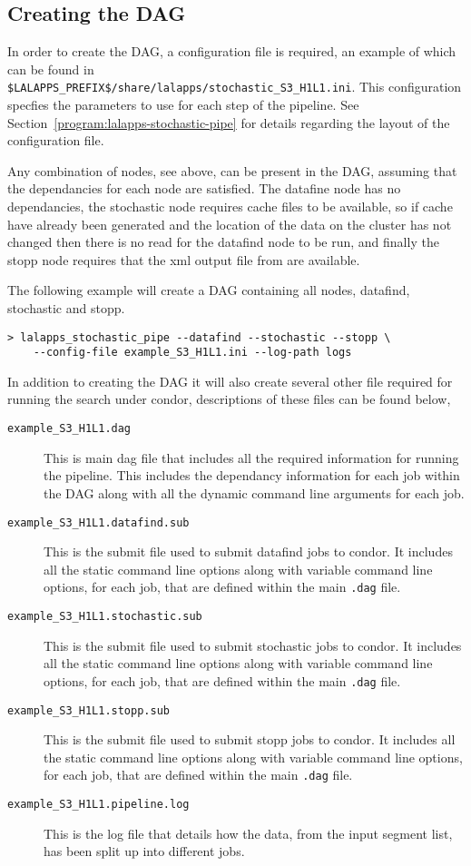 \subsection{Creating the DAG}

In order to create the DAG, a configuration file is required, an example
of which can be found in\\
\texttt{\$LALAPPS\_PREFIX\$/share/lalapps/stochastic\_S3\_H1L1.ini}.
This configuration specfies the parameters to use for each step of the
pipeline. See Section~\ref{program:lalapps-stochastic-pipe} for details
regarding the layout of the configuration file.

Any combination of nodes, see above, can be present in the DAG, assuming
that the dependancies for each node are satisfied. The datafine node has
no dependancies, the stochastic node requires cache files to be
available, so if cache have already been generated and the location of
the data on the cluster has not changed then there is no read for the
datafind node to be run, and finally the stopp node requires that the
xml output file from  are available.

The following example will create a DAG containing all nodes, datafind,
stochastic and stopp.

\begin{verbatim}
> lalapps_stochastic_pipe --datafind --stochastic --stopp \
    --config-file example_S3_H1L1.ini --log-path logs
\end{verbatim}

In addition to creating the DAG it will also create several other file
required for running the search under condor, descriptions of these
files can be found below,

\begin{description}
\item[\texttt{example\_S3\_H1L1.dag}]
This is main dag file that includes all the required information for
running the pipeline. This includes the dependancy information for each
job within the DAG along with all the dynamic command line arguments for
each job.
\item[\texttt{example\_S3\_H1L1.datafind.sub}]
This is the submit file used to submit datafind jobs to condor. It
includes all the static command line options along with variable command
line options, for each job, that are defined within the main
\texttt{.dag} file.
\item[\texttt{example\_S3\_H1L1.stochastic.sub}]
This is the submit file used to submit stochastic jobs to condor. It
includes all the static command line options along with variable command
line options, for each job, that are defined within the main
\texttt{.dag} file.
\item[\texttt{example\_S3\_H1L1.stopp.sub}]
This is the submit file used to submit stopp jobs to condor. It
includes all the static command line options along with variable command
line options, for each job, that are defined within the main
\texttt{.dag} file.
\item[\texttt{example\_S3\_H1L1.pipeline.log}]
This is the log file that details how the data, from the input segment
list, has been split up into different jobs.
\end{description}

